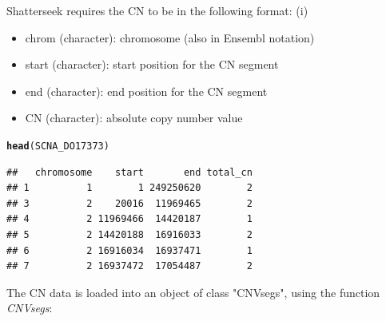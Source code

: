 \documentclass[twoside,a4wide,11pt]{article}\usepackage[]{graphicx}\usepackage[]{color}
\makeatletter
\newcommand{\hlstd}[1]{\textcolor[rgb]{0.345,0.345,0.345}{#1}}%
\newcommand{\hlkwd}[1]{\textcolor[rgb]{0.737,0.353,0.396}{\textbf{#1}}}%
\newenvironment{kframe}{%
 \def\at@end@of@kframe{}%
 \ifinner\ifhmode%
  \def\at@end@of@kframe{\end{minipage}}%
  \begin{minipage}{\columnwidth}%
 \fi\fi%
 \def\FrameCommand##1{\hskip\@totalleftmargin \hskip-\fboxsep
 \colorbox{shadecolor}{##1}\hskip-\fboxsep
     \hskip-\linewidth \hskip-\@totalleftmargin \hskip\columnwidth}%
 \MakeFramed {\advance\hsize-\width
   \@totalleftmargin\z@ \linewidth\hsize
   \@setminipage}}%
 {\par\unskip\endMakeFramed%
 \at@end@of@kframe}
\newenvironment{knitrout}{}{} %
\makeatother
\begin{document}
Shatterseek requires the CN to be in the following format:
(i)
\begin{itemize}
\item chrom (character): chromosome (also in Ensembl notation)
\item start (character): start position for the CN segment
\item end (character): end position for the CN segment
\item CN (character): absolute copy number value
\end{itemize}
\begin{knitrout}
\color{fgcolor}\begin{kframe}
\begin{alltt}
\hlkwd{head}\hlstd{(SCNA_DO17373)}
\end{alltt}
\begin{verbatim}
##   chromosome    start       end total_cn
## 1          1        1 249250620        2
## 3          2    20016  11969465        2
## 4          2 11969466  14420187        1
## 5          2 14420188  16916033        2
## 6          2 16916034  16937471        1
## 7          2 16937472  17054487        2
\end{verbatim}
\end{kframe}
\end{knitrout}

The CN data is  loaded into an object of class "CNVsegs", using the function {\it CNVsegs}:

\end{document}
